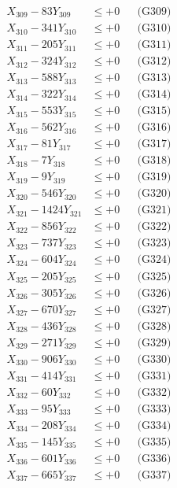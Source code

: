\documentclass[a4paper,10pt]{article}
\begin{document}
{\begin{align}
X_{309} - 83Y_{309} &\leq +0 && \text{(G309)} \\
X_{310} - 341Y_{310} &\leq +0 && \text{(G310)} \\
\allowbreak
X_{311} - 205Y_{311} &\leq +0 && \text{(G311)} \\
X_{312} - 324Y_{312} &\leq +0 && \text{(G312)} \\
X_{313} - 588Y_{313} &\leq +0 && \text{(G313)} \\
X_{314} - 322Y_{314} &\leq +0 && \text{(G314)} \\
X_{315} - 553Y_{315} &\leq +0 && \text{(G315)} \\
X_{316} - 562Y_{316} &\leq +0 && \text{(G316)} \\
X_{317} - 81Y_{317} &\leq +0 && \text{(G317)} \\
X_{318} - 7Y_{318} &\leq +0 && \text{(G318)} \\
X_{319} - 9Y_{319} &\leq +0 && \text{(G319)} \\
X_{320} - 546Y_{320} &\leq +0 && \text{(G320)} \\
\allowbreak
X_{321} - 1424Y_{321} &\leq +0 && \text{(G321)} \\
X_{322} - 856Y_{322} &\leq +0 && \text{(G322)} \\
X_{323} - 737Y_{323} &\leq +0 && \text{(G323)} \\
X_{324} - 604Y_{324} &\leq +0 && \text{(G324)} \\
X_{325} - 205Y_{325} &\leq +0 && \text{(G325)} \\
X_{326} - 305Y_{326} &\leq +0 && \text{(G326)} \\
X_{327} - 670Y_{327} &\leq +0 && \text{(G327)} \\
X_{328} - 436Y_{328} &\leq +0 && \text{(G328)} \\
X_{329} - 271Y_{329} &\leq +0 && \text{(G329)} \\
X_{330} - 906Y_{330} &\leq +0 && \text{(G330)} \\
\allowbreak
X_{331} - 414Y_{331} &\leq +0 && \text{(G331)} \\
X_{332} - 60Y_{332} &\leq +0 && \text{(G332)} \\
X_{333} - 95Y_{333} &\leq +0 && \text{(G333)} \\
X_{334} - 208Y_{334} &\leq +0 && \text{(G334)} \\
X_{335} - 145Y_{335} &\leq +0 && \text{(G335)} \\
X_{336} - 601Y_{336} &\leq +0 && \text{(G336)} \\
X_{337} - 665Y_{337} &\leq +0 && \text{(G337)} \\

\end{align}}
\end{document}
